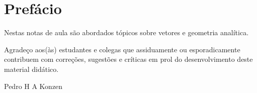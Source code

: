 
\chapter*{Prefácio}\label{prefacio}

Nestas notas de aula são abordados tópicos sobre vetores e geometria analítica.

Agradeço aos(às) estudantes e colegas que assiduamente ou esporadicamente contribuem com correções, sugestões e críticas em prol do desenvolvimento deste material didático.

\begin{flushright}
  Pedro H A Konzen
\end{flushright}

